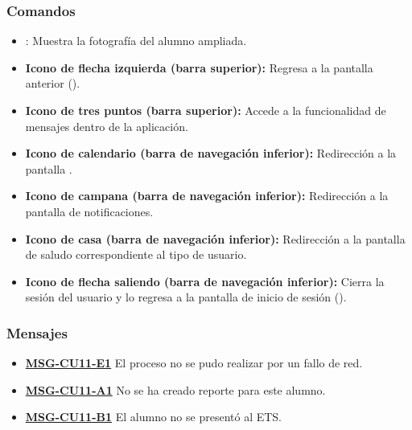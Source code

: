 \subsubsection{Comandos}
\begin{itemize}
	\item {}: Muestra la fotografía del alumno ampliada.
	\item \textbf{Icono de flecha izquierda (barra superior):} Regresa a la pantalla anterior ().
	\item \textbf{Icono de tres puntos (barra superior):} Accede a la funcionalidad de mensajes dentro de la aplicación.
	\item \textbf{Icono de calendario (barra de navegación inferior):} Redirección a la pantalla .
	\item \textbf{Icono de campana (barra de navegación inferior):} Redirección a la pantalla de notificaciones.
	\item \textbf{Icono de casa (barra de navegación inferior):} Redirección a la pantalla de saludo correspondiente al tipo de usuario.
	\item \textbf{Icono de flecha saliendo (barra de navegación inferior):} Cierra la sesión del usuario y lo regresa a la pantalla de inicio de sesión ().
\end{itemize}

\subsubsection{Mensajes}
\begin{itemize}
	\item \textbf{\hyperref[msg:CU11-E1]{MSG-CU11-E1}} El proceso no se pudo realizar por un fallo de red.
	\item \textbf{\hyperref[msg:CU11-A1]{MSG-CU11-A1}} No se ha creado reporte para este alumno.
	\item \textbf{\hyperref[msg:CU11-B1]{MSG-CU11-B1}} El alumno no se presentó al ETS.
\end{itemize}
